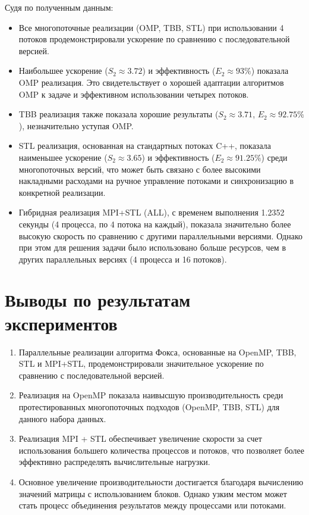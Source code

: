 \documentclass[12pt]{article}
\begin{document}
Судя по полученным данным:
\begin{itemize}
    \item Все многопоточные реализации (OMP, TBB, STL) при использовании 4 потоков продемонстрировали ускорение по сравнению с последовательной версией.
    \item Наибольшее ускорение ($S_2 \approx 3.72$) и эффективность ($E_2 \approx 93\%$) показала OMP реализация. Это свидетельствует о хорошей адаптации алгоритмов OMP к задаче и эффективном использовании четырех потоков.
    \item TBB реализация также показала хорошие результаты ($S_2 \approx 3.71$, $E_2 \approx 92.75\%$), незначительно уступая OMP.
    \item STL реализация, основанная на стандартных потоках C++, показала наименьшее ускорение ($S_2 \approx 3.65$) и эффективность ($E_2 \approx 91.25\%$) среди многопоточных версий, что может быть связано с более высокими накладными расходами на ручное управление потоками и синхронизацию в конкретной реализации.
    \item Гибридная реализация MPI+STL (ALL), с временем выполнения 1.2352 секунды (4 процесса, по 4 потока на каждый), показала значительно более высокую скорость по сравнению с другими параллельными версиями. Однако при этом для решения задачи было использовано больше ресурсов, чем в других параллельных версиях (4 процесса и 16 потоков).
\end{itemize}

\newpage
\section{Выводы по результатам экспериментов}
\begin{enumerate}
    \item Параллельные реализации алгоритма Фокса, основанные на OpenMP, TBB, STL и MPI+STL, продемонстрировали значительное ускорение по сравнению с последовательной версией.
    \item Реализация на OpenMP показала наивысшую производительность среди протестированных многопоточных подходов (OpenMP, TBB, STL) для данного набора данных.
    \item  Реализация MPI + STL обеспечивает увеличение скорости за счет использования большего количества процессов и потоков, что позволяет более эффективно распределять вычислительные нагрузки.
    \item Основное увеличение производительности достигается благодаря вычислению значений матрицы с использованием блоков. Однако узким местом может стать процесс объединения результатов между процессами или потоками.
\end{enumerate}
\end{document}
